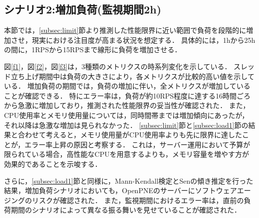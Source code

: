 \documentclass[twoside,twocolumn,10pt]{jarticle}  %
\begin{document}
\subsection{シナリオ2:増加負荷(監視期間2h)}\label{subsec:load2}

本節では，\ref{subsec:limit}節より推測した性能限界に近い範囲で負荷を段階的に増加させ，現実における注目度が高まる状況を想定する．
具体的には，1hから25hの間に，1RPSから15RPSまで線形に負荷を増加させる．

図\ref{f1}，図\ref{f2}，図\ref{f3}は，3種類のメトリクスの時系列変化を示している．
スレッド立ち上げ期間中は負荷の大きさにより，各メトリクスが比較的高い値を示している．
増加負荷の期間では，負荷の増加に伴い，全メトリクスが増加していることが確認できる．
特にエラー率は，負荷が約10RPS程度に達する16時間ごろから急激に増加しており，推測された性能限界の妥当性が確認された．
また，CPU使用率とメモリ使用量については，同時間帯までは増加傾向にあったが，それ以降は急激な増加は見られなかった．
\ref{subsec:limit}節と\ref{subsec:load1}節の結果と合わせて考えると，メモリ使用量がCPU使用率よりも先に限界に達したことが，エラー率上昇の原因と考察する．
これは，サーバー運用において予算が限られている場合，高性能なCPUを用意するよりも，メモリ容量を増やす方が効果的であることを示唆する．\par
さらに，\ref{subsec:load1}節と同様に，Mann-Kendall検定\cite{Mann1945Nonparametric}とSenの傾き推定\cite{Sen1968Estimates}を行った結果，増加負荷シナリオにおいても，OpenPNEのサーバーにソフトウェアエージングのリスクが確認された．
また，監視期間におけるエラー率は，直前の負荷期間のシナリオによって異なる振る舞いを見せていることが確認された．
\end{document}
